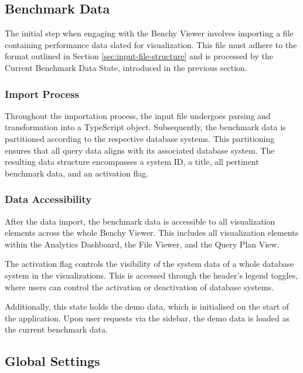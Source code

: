 \subsection{Benchmark Data}\label{sec:input-data}

The initial step when engaging with the Benchy Viewer involves importing a file containing performance data slated for visualization. This file must adhere to the format outlined in Section \ref{sec:input-file-structure} and is processed by the Current Benchmark Data State, introduced in the previous section. 

\subsubsection{Import Process}

Throughout the importation process, the input file undergoes parsing and transformation into a TypeScript object. Subsequently, the benchmark data is partitioned according to the respective database systems. This partitioning ensures that all query data aligns with its associated database system. The resulting data structure encompasses a system ID, a title, all pertinent benchmark data, and an activation flag.

\subsubsection{Data Accessibility}

After the data import, the benchmark data is accessible to all visualization elements across the whole Benchy Viewer. This includes all visualization elements within the Analytics Dashboard, the File Viewer, and the Query Plan View.

The activation flag controls the visibility of the system data of a whole database system in the visualizations. This is accessed through the header's legend toggles, where users can control the activation or deactivation of database systems.

Additionally, this state holds the demo data, which is initialised on the start of the application. Upon user requests via the sidebar, the demo data is loaded as the current benchmark data.



\subsection{Global Settings}\label{sec:global-settings}


